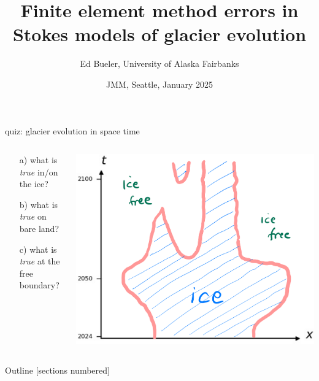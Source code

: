 \documentclass[10pt,dvipsnames]{beamer}
\title{Finite element method errors in Stokes models of glacier evolution}
\date{JMM, Seattle, January 2025}
\author{Ed Bueler, University of Alaska Fairbanks}
\begin{document}
\graphicspath{{../NWG24/figs/}}

\maketitle

\begin{frame}{quiz: glacier evolution in space time}

\bigskip \bigskip

\begin{columns}
\begin{column}{0.26\textwidth}
\begin{itemize}
\item[a)] what is \emph{true} in/on the ice?
\item[b)] what is \emph{true} on bare land?
\item[c)] what is \emph{true} at the free boundary?
\end{itemize}\end{column}
\begin{column}{0.74\textwidth}
\hfill \includegraphics[width=\textwidth]{xtcrop}
\end{column}
\end{columns}
\end{frame}


\begin{frame}{Outline}
  [sections numbered]
  \tableofcontents[hideallsubsections]
\end{frame}

\AtBeginSection[]
{%
}
\end{document}
